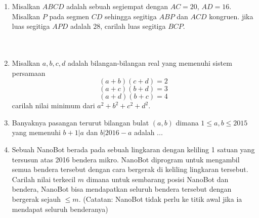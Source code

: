 \documentclass[12pt]{scrartcl}
\begin{document}
\begin{enumerate}[resume]
		
		
		\item Misalkan $ABCD$ adalah sebuah segiempat dengan $AC=20$, $AD=16$. Misalkan $P$ pada segmen $CD$ sehingga segitiga $ABP$ dan $ACD$ kongruen. jika luas segitiga $APD$ adalah $28$, carilah luas segitiga $BCP$.\\
		\\
		\\
		
		\item Misalkan $a, b, c, d$ adalah bilangan-bilangan real yang memenuhi sistem persamaan
		$$(a+b)(c+d)=2$$
		$$(a+c)(b+d)=3$$
		$$(a+d)(b+c)=4$$
		carilah nilai minimum dari $a^2+b^2+c^2+d^2$. 
		
		\item Banyaknya pasangan terurut bilangan bulat $(a, b)$ dimana $1 \le a, b \le 2015$ yang memenuhi $b + 1|a$ dan $b|2016 - a$ adalah ...
		
		\item Sebuah NanoBot berada pada sebuah lingkaran dengan keliling 1 satuan yang tersusun atas 2016 bendera mikro. NanoBot diprogram untuk mengambil semua bendera tersebut dengan cara bergerak di keliling lingkaran tersebut. Carilah nilai terkecil $m$ dimana untuk sembarang posisi NanoBot dan bendera, NanoBot bisa mendapatkan seluruh bendera tersebut dengan bergerak sejauh $\le m$. (Catatan: NanoBot tidak perlu ke titik awal jika ia mendapat seluruh benderanya)
		
\end{enumerate}
\end{document}
